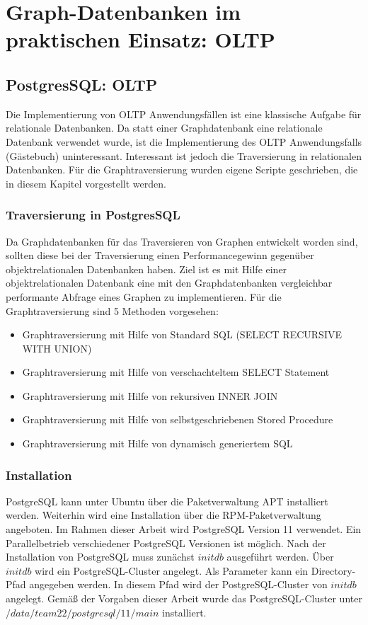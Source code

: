 \chapter{Graph-Datenbanken im praktischen Einsatz: \ac{OLTP}}
\section{PostgresSQL: OLTP}
Die Implementierung von OLTP Anwendungsfällen ist eine klassische Aufgabe für relationale Datenbanken.
Da statt einer Graphdatenbank eine relationale Datenbank verwendet wurde, ist die Implementierung des OLTP Anwendungsfalls (Gästebuch) uninteressant.
Interessant ist jedoch die Traversierung in relationalen Datenbanken.
Für die Graphtraversierung wurden eigene Scripte geschrieben, die in diesem Kapitel vorgestellt werden.
\subsection{Traversierung in PostgresSQL}
Da Graphdatenbanken für das Traversieren von Graphen entwickelt worden sind, sollten diese bei der Traversierung einen Performancegewinn gegenüber objektrelationalen Datenbanken haben.
Ziel ist es mit Hilfe einer objektrelationalen Datenbank eine mit den Graphdatenbanken vergleichbar performante Abfrage eines Graphen zu implementieren.
Für die Graphtraversierung sind 5 Methoden vorgesehen:
\begin{itemize}
    \item Graphtraversierung mit Hilfe von Standard \ac{SQL} (SELECT RECURSIVE WITH UNION)
    \item Graphtraversierung mit Hilfe von verschachteltem SELECT Statement
    \item Graphtraversierung mit Hilfe von rekursiven INNER JOIN
    \item Graphtraversierung mit Hilfe von selbstgeschriebenen Stored Procedure
    \item Graphtraversierung mit Hilfe von dynamisch generiertem \ac{SQL}
\end{itemize}
\subsection{Installation}
PostgreSQL kann unter Ubuntu über die Paketverwaltung APT installiert werden. Weiterhin wird eine Installation über die RPM-Paketverwaltung angeboten. Im Rahmen dieser
Arbeit wird PostgreSQL Version 11 verwendet. Ein Parallelbetrieb verschiedener PostgreSQL Versionen ist möglich. Nach der Installation von PostgreSQL muss zunächst
$initdb$ ausgeführt werden. Über $initdb$ wird ein PostgreSQL-Cluster angelegt. Als Parameter kann ein Directory-Pfad angegeben werden.
In diesem Pfad wird der PostgreSQL-Cluster von $initdb$ angelegt. Gemäß der Vorgaben dieser Arbeit wurde das PostgreSQL-Cluster unter
$/data/team22/postgresql/11/main$ installiert.
